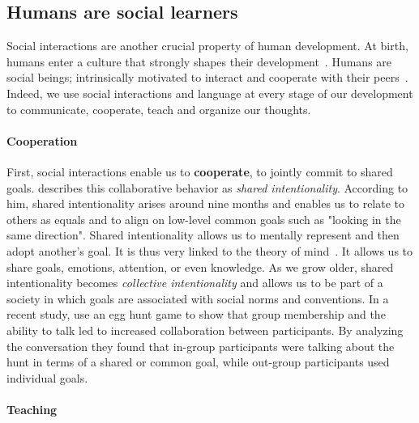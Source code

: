

\subsection{Humans are social learners}

Social interactions are another crucial property of human development. At birth, humans enter a culture that strongly shapes their development~\citep{whorf_language_1956}. Humans are social beings; intrinsically motivated to interact and cooperate with their peers~\citep{tomasello_cultural_1999,tomasello_understanding_2005, brewer2014addressing}. Indeed, we use social interactions and language at every stage of our development to communicate, cooperate, teach and organize our thoughts. 

\paragraph{Cooperation}

First, social interactions enable us to \textbf{cooperate}, to jointly commit to shared goals. \citet{Tomasello+2019} describes this collaborative behavior as \textit{shared intentionality}. According to him, shared intentionality arises around nine months and enables us to relate to others as equals and to align on low-level common goals such as "looking in the same direction". Shared intentionality allows us to mentally represent and then adopt another's goal. It is thus very linked to the theory of mind~\citep{wellman1992child}. It allows us to share goals, emotions, attention, or even knowledge. As we grow older, shared intentionality becomes \textit{collective intentionality} and allows us to be part of a society in which goals are associated with social norms and conventions. In a recent study, \citet{mcclung2017cooperation} use an egg hunt game to show that group membership and the ability to talk led to increased collaboration between participants. By analyzing the conversation they found that in-group participants were talking about the hunt in terms of a shared or common goal, while out-group participants used individual goals.

\paragraph{Teaching}


